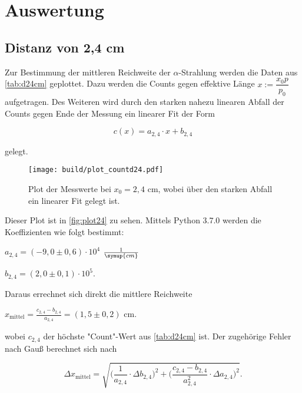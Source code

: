 \section{Auswertung}
\label{sec:Auswertung}

\subsection{Distanz von 2,4 cm}

Zur Bestimmung der mittleren Reichweite der $\alpha$-Strahlung werden die Daten aus \autoref{tab:d24cm} geplottet.
Dazu werden die Counts gegen effektive Länge $x := \dfrac{x_0 p}{p_0}$ aufgetragen.
Des Weiteren wird durch den starken nahezu linearen Abfall der Counts gegen Ende der Messung ein linearer Fit der Form

\begin{equation}
    c(x) = a_{2,4} \cdot x + b_{2,4}
\end{equation}

gelegt.



\begin{figure}
    \centering
    \texttt{[image: build/plot\_countd24.pdf]}
    \caption{Plot der Messwerte bei $x_0 = 2,4$ cm, wobei über den starken Abfall ein linearer Fit gelegt ist.}
    \label{fig:plot24}
\end{figure}

Dieser Plot ist in \autoref{fig:plot24} zu sehen.
Mittels Python 3.7.0 werden die Koeffizienten wie folgt bestimmt:

\begin{center}
    $a_{2,4} = (-9,0 \pm 0,6) \cdot 10^{4}$ $\frac{1}{\symup{cm}}$

    $b_{2,4} = (2,0 \pm 0,1) \cdot 10^{5}$.
\end{center}

Daraus errechnet sich direkt die mittlere Reichweite 

\begin{center}
    $x_\text{mittel} = \frac{c_{2,4} - b_{2,4}}{a_{2,4}} = (1,5 \pm 0,2)$ cm.
\end{center}

wobei $c_{2,4}$ der höchste "Count"-Wert aus \autoref{tab:d24cm} ist. Der zugehörige Fehler nach Gauß berechnet sich nach

\begin{equation}
    \Delta x_\text{mittel} = \sqrt{\bigg(\frac{1}{a_{2,4}} \cdot \Delta b_{2,4} \bigg)^2 + \bigg( \frac{c_{2,4}-b_{2,4}}{a_{2,4}^2} \cdot \Delta a_{2,4} \bigg)^2}.
\end{equation}

